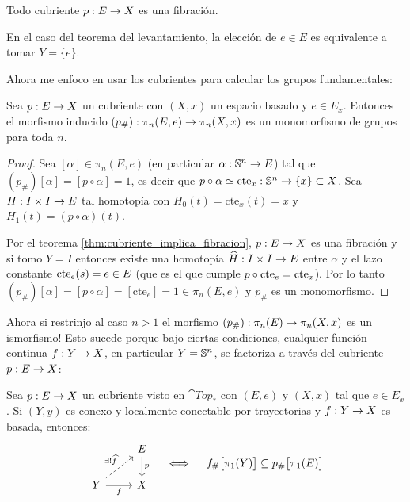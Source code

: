 \documentclass[../../topologia_algebraica]{subfiles}
\begin{document}
\begin{thm}\label{thm:cubriente_implica_fibracion}
  Todo cubriente $p:E\rightarrow X$ es una fibraci\'on.
\end{thm}

En el caso del teorema del levantamiento, la elecci\'on de $e\in E$ es equivalente a tomar $Y=\{e\}$.

Ahora me enfoco en usar los cubrientes para calcular los grupos fundamentales:

\begin{prop}
  Sea $p:E\rightarrow X$ un cubriente con $(X,x)$ un espacio basado y $e\in E_x$. Entonces el morfismo
  inducido $(p_{\#}):\pi_n(E,e)\rightarrow\pi_n(X,x)$ es un monomorfismo de grupos para toda $n$.
\end{prop}
\begin{proof}
  Sea $[\alpha]\in\pi_n(E,e)$ (en particular $\alpha:\mathbb{S}^n\rightarrow E$) tal que
  $(p_{\#})[\alpha]=[p\circ\alpha]=1$, es decir que
  $p\circ\alpha \simeq \text{cte}_x:\mathbb{S}^n\rightarrow\{x\}\subset X$. Sea $H:I\times I\rightarrow E$ tal
  homotop\'ia con $H_0(t)=\text{cte}_x(t)=x$ y $H_1(t)=(p\circ\alpha)(t)$.

  Por el teorema \ref{thm:cubriente_implica_fibracion}, $p:E\rightarrow X$ es una fibraci\'on y si tomo
  $Y=I$ entonces existe una homotop\'ia $\widehat{ H }:I\times I\rightarrow E$ entre $\alpha$ y el lazo
  constante $\text{cte}_e(s)=e\in E$ (que es el que cumple $p\circ \text{cte}_e=\text{\text{cte}}_x$). Por lo tanto
  $(p_{\#})[\alpha]=[p\circ\alpha]=[\text{cte}_e]=1\in\pi_n(E,e)$ y $p_{\#}$ es un monomorfismo.
\end{proof}

Ahora si restrinjo al caso $n>1$ el morfismo $(p_{\#}):\pi_n(E)\rightarrow\pi_n(X,x)$ es un ismorfismo! Esto
sucede porque bajo ciertas condiciones, cualquier funci\'on continua $f:Y\rightarrow X$, en particular $Y=\mathbb{S}^n$,
se factoriza a trav\'es del cubriente $p:E \rightarrow X$:

\begin{thm}\label{thm:factoriza_atrd_cubriente}
  Sea $p:E\rightarrow X$ un cubriente visto en $\cat{Top}_*$ con $(E,e)$ y $(X,x)$ tal que $e\in E_x$.
  Si $(Y,y)$ es conexo y localmente conectable por trayectorias y $f:Y\rightarrow X$ es basada, entonces:
  \[
    \begin{tikzcd}
      & E \arrow[d,"p"] \\
      Y \arrow[ur,dashed,"\exists!\what{f}"] \arrow[r,"f"'] & X
    \end{tikzcd} \quad\iff\quad f_{\#}\big[\pi_1(Y) \big] \subseteq p_{\#}\big[\pi_1(E) \big]
  \]
\end{thm}
\end{document}
